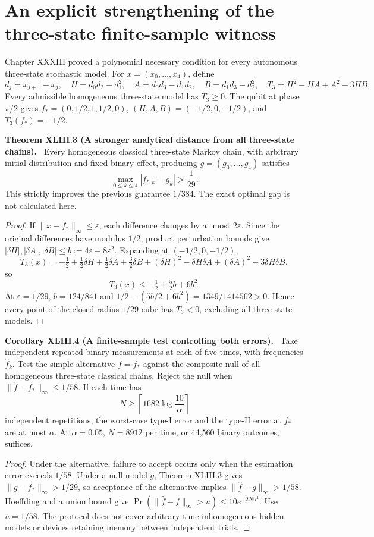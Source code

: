 \documentclass[11pt,a4paper,oneside]{book}
\newcommand{\statement}[3]{\par\medskip\noindent\textbf{#1 #2 (#3).}\ }
\begin{document}
\section{An explicit strengthening of the three-state finite-sample witness}
Chapter XXXIII proved a polynomial necessary condition for every autonomous three-state stochastic model. For $x=(x_0,\ldots,x_4)$, define
\[d_j=x_{j+1}-x_j,\quad H=d_0d_2-d_1^2,\quad A=d_0d_3-d_1d_2,\quad B=d_1d_3-d_2^2,\quad T_3=H^2-HA+A^2-3HB.\]
Every admissible homogeneous three-state model has $T_3\ge0$. The qubit at phase $\pi/2$ gives $f_*=(0,1/2,1,1/2,0)$, $(H,A,B)=(-1/2,0,-1/2)$, and $T_3(f_*)=-1/2$.
\statement{Theorem}{XLIII.3}{A stronger analytical distance from all three-state chains}
Every homogeneous classical three-state Markov chain, with arbitrary initial distribution and fixed binary effect, producing $g=(g_0,\ldots,g_4)$ satisfies
\begin{equation}\max_{0\le k\le4}|f_{*,k}-g_k|>\frac1{29}.\tag{183}\end{equation}
This strictly improves the previous guarantee $1/384$. The exact optimal gap is not calculated here.
\begin{proof}
If $\|x-f_*\|_\infty\le\varepsilon$, each difference changes by at most $2\varepsilon$. Since the original differences have modulus $1/2$, product perturbation bounds give $|\delta H|,|\delta A|,|\delta B|\le b:=4\varepsilon+8\varepsilon^2$. Expanding at $(-1/2,0,-1/2)$,
\[T_3(x)=-\tfrac12+\tfrac12\delta H+\tfrac12\delta A+\tfrac32\delta B+(\delta H)^2-\delta H\delta A+(\delta A)^2-3\delta H\delta B,\]
so
\begin{equation}T_3(x)\le-\tfrac12+\tfrac52b+6b^2.\tag{184}\end{equation}
At $\varepsilon=1/29$, $b=124/841$ and $1/2-(5b/2+6b^2)=1349/1414562>0$. Hence every point of the closed radius-$1/29$ cube has $T_3<0$, excluding all three-state models.
\end{proof}
\statement{Corollary}{XLIII.4}{A finite-sample test controlling both errors}
Take independent repeated binary measurements at each of five times, with frequencies $\widehat f_k$. Test the simple alternative $f=f_*$ against the composite null of all homogeneous three-state classical chains. Reject the null when $\|\widehat f-f_*\|_\infty\le1/58$. If each time has
\[N\ge\left\lceil1682\log\frac{10}{\alpha}\right\rceil\]
independent repetitions, the worst-case type-I error and the type-II error at $f_*$ are at most $\alpha$. At $\alpha=0.05$, $N=8912$ per time, or 44,560 binary outcomes, suffices.
\begin{proof}
Under the alternative, failure to accept occurs only when the estimation error exceeds $1/58$. Under a null model $g$, Theorem XLIII.3 gives $\|g-f_*\|_\infty>1/29$, so acceptance of the alternative implies $\|\widehat f-g\|_\infty>1/58$. Hoeffding and a union bound give $\Pr(\|\widehat f-f\|_\infty>u)\le10e^{-2Nu^2}$. Use $u=1/58$. The protocol does not cover arbitrary time-inhomogeneous hidden models or devices retaining memory between independent trials.
\end{proof}
\end{document}
